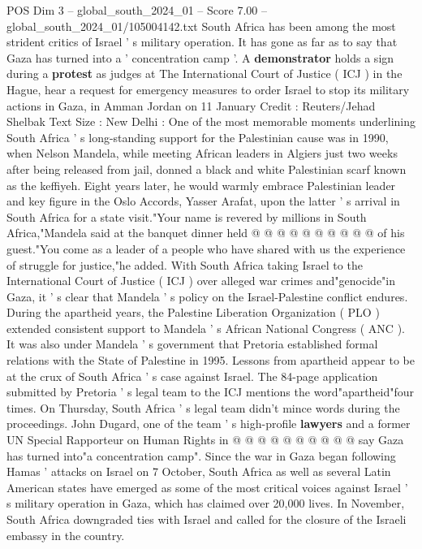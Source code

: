 \begin{textsample}{POS Dim 3 – global\_south\_2024\_01 – Score 7.00 – global\_south\_2024\_01/105004142.txt}  \label{ex:f3_pos_380}
South Africa has been among the most strident critics of Israel ' s military operation.
It has gone as far as to say that Gaza has turned into a ' concentration camp '.
A \textbf{demonstrator} holds a sign during a \textbf{protest} as judges at The International Court of Justice ( ICJ ) in the Hague, hear a request for emergency measures to order Israel to stop its military actions in Gaza, in Amman Jordan on 11 January Credit : Reuters/Jehad Shelbak Text Size : New Delhi : One of the most memorable moments underlining South Africa ' s long-standing support for the Palestinian cause was in 1990, when Nelson Mandela, while meeting African leaders in Algiers just two weeks after being released from jail, donned a black and white Palestinian scarf known as the keffiyeh.
Eight years later, he would warmly embrace Palestinian leader and key figure in the Oslo Accords, Yasser Arafat, upon the latter ' s arrival in South Africa for a state visit."Your name is revered by millions in South Africa,"Mandela said at the banquet dinner held @ @ @ @ @ @ @ @ @ @ of his guest."You come as a leader of a people who have shared with us the experience of struggle for justice,"he added.
With South Africa taking Israel to the International Court of Justice ( ICJ ) over alleged war crimes and"genocide"in Gaza, it ' s clear that Mandela ' s policy on the Israel-Palestine conflict endures.
During the apartheid years, the Palestine Liberation Organization ( PLO ) extended consistent support to Mandela ' s African National Congress ( ANC ).
It was also under Mandela ' s government that Pretoria established formal relations with the State of Palestine in 1995.
Lessons from apartheid appear to be at the crux of South Africa ' s case against Israel.
The 84-page application submitted by Pretoria ' s legal team to the ICJ mentions the word"apartheid"four times.
On Thursday, South Africa ' s legal team didn't mince words during the proceedings.
John Dugard, one of the team ' s high-profile \textbf{lawyers} and a former UN Special Rapporteur on Human Rights in @ @ @ @ @ @ @ @ @ @ say Gaza has turned into"a concentration camp".
Since the war in Gaza began following Hamas ' attacks on Israel on 7 October, South Africa as well as several Latin American states have emerged as some of the most critical voices against Israel ' s military operation in Gaza, which has claimed over 20,000 lives.
In November, South Africa downgraded ties with Israel and called for the closure of the Israeli embassy in the country.

\end{textsample}
